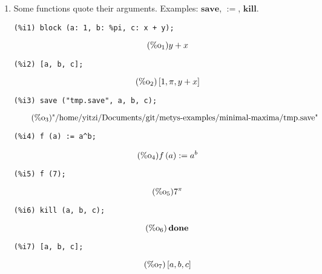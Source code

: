 \documentclass[12pt,leqno]{article}
\begin{document}
\begin{enumerate}
\item Some functions quote their arguments.
Examples: $\mathbf{save}$, $\mathbf{:=}$, $\mathbf{kill}$.
\begin{verbatim}
(%i1) block (a: 1, b: %pi, c: x + y);
\end{verbatim}
\begin{equation}
\tag{$\mathop{\mathrm{\%o}}_{1}$}y+x
\label{eq:doc-group1-code15-1-1}
\end{equation}
\begin{verbatim}
(%i2) [a, b, c];
\end{verbatim}
\begin{equation}
\tag{$\mathop{\mathrm{\%o}}_{2}$}\left[1, \pi, y+x\right]
\label{eq:doc-group1-code15-2-1}
\end{equation}
\begin{verbatim}
(%i3) save ("tmp.save", a, b, c);
\end{verbatim}
\begin{equation}
\tag{$\mathop{\mathrm{\%o}}_{3}$}\mbox{"/home/yitzi/Documents/git/metys-examples/minimal-maxima/tmp.save"}
\label{eq:doc-group1-code15-3-1}
\end{equation}
\begin{verbatim}
(%i4) f (a) := a^b;
\end{verbatim}
\begin{equation}
\tag{$\mathop{\mathrm{\%o}}_{4}$}f\left(a\right) := {a}^{b}
\label{eq:doc-group1-code15-4-1}
\end{equation}
\begin{verbatim}
(%i5) f (7);
\end{verbatim}
\begin{equation}
\tag{$\mathop{\mathrm{\%o}}_{5}$}{7}^{\pi}
\label{eq:doc-group1-code15-5-1}
\end{equation}
\begin{verbatim}
(%i6) kill (a, b, c);
\end{verbatim}
\begin{equation}
\tag{$\mathop{\mathrm{\%o}}_{6}$}\mathop\mathbf{done}
\label{eq:doc-group1-code15-6-1}
\end{equation}
\begin{verbatim}
(%i7) [a, b, c];
\end{verbatim}
\begin{equation}
\tag{$\mathop{\mathrm{\%o}}_{7}$}\left[a, b, c\right]
\label{eq:doc-group1-code15-7-1}
\end{equation}



\end{enumerate}
\end{document}
